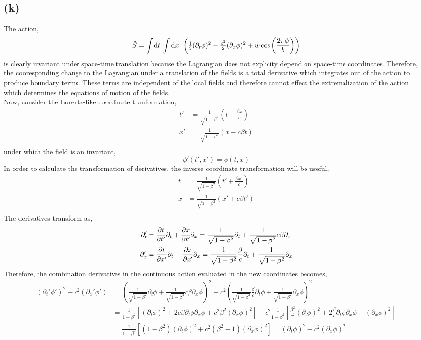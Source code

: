 \documentclass[12pt]{extarticle}
\begin{document}
\subsection*{(k)}
The action,
\[\tilde{S} = \int \mathrm{d}t \: \int \mathrm{d}x \: \: \left( \tfrac{1}{2} (\partial_t \phi)^2 - \tfrac{c^2}{2} (\partial_x \phi)^2 + w \cos \left(\frac{2 \pi \phi}{b} \right) \right) \]
is clearly invariant under space-time translation because the Lagrangian does not explicity depend on space-time coordinates. Therefore, the cooresponding change to the Lagrangian under a translation of the fields is a total derivative which integrates out of the action to produce boundary terms. These terms are independent of the local fields and therefore cannot effect the extremalization of the action which determines the equations of motion of the fields. \bigskip \\
Now, consider the Lorentz-like coordinate tranformation,
\begin{align*}
t' & = \frac{1}{\sqrt{1 - \beta^2}} \left( t - \frac{\beta x}{c} \right) \\
x' & = \frac{1}{\sqrt{1 - \beta^2}} \left( x - c \beta t \right) \\
\end{align*}
under which the field is an invariant,
\[\phi'(t', x')  = \phi(t, x)\]
In order to calculate the transformation of derivatives, the inverse coordinate transformation will be useful,
\begin{align*}
t & = \frac{1}{\sqrt{1 - \beta^2}} \left( t' + \frac{\beta x'}{c} \right) \\
x & = \frac{1}{\sqrt{1 - \beta^2}} \left( x' + c \beta t' \right) \\
\end{align*}
The derivatives transform as,
\begin{align*}
\partial_t' & = \frac{\partial{t}}{\partial{t'}} \partial_t + \frac{\partial{x}}{\partial{t'}} \partial_x = \frac{1}{\sqrt{1 - \beta^2}} \partial_t +  \frac{1}{\sqrt{1 - \beta^2}} c \beta \partial_x 
\\
\partial_x' & = \frac{\partial{t}}{\partial{x'}} \partial_t + \frac{\partial{x}}{\partial{x'}} \partial_x = \frac{1}{\sqrt{1 - \beta^2}} \frac{\beta}{c} \partial_t + \frac{1}{\sqrt{1 - \beta^2}} \partial_x 
\end{align*}
Therefore, the combination derivatives in the continuous action evaluated in the new coordinates becomes,
\begin{align*} 
(\partial_t' \phi')^2 - c^2 (\partial_x' \phi') & = \left( \frac{1}{\sqrt{1 - \beta^2}} \partial_t \phi +  \frac{1}{\sqrt{1 - \beta^2}} c \beta \partial_x \phi \right)^2 - c^2 \left( \frac{1}{\sqrt{1 - \beta^2}} \frac{\beta}{c} \partial_t \phi + \frac{1}{\sqrt{1 - \beta^2}} \partial_x \phi \right)^2 
\\
& = \frac{1}{1 - \beta^2} \left[ (\partial_t \phi)^2 + 2 c \beta \partial_t \phi \partial_x \phi + c^2 \beta^2 (\partial_x \phi)^2 \right] - c^2 \frac{1}{1 - \beta^2} \left[ \frac{\beta^2}{c^2} (\partial_t \phi)^2 + 2 \frac{\beta}{c} \partial_t \phi \partial_x \phi + (\partial_x \phi)^2 \right] 
\\
& = \frac{1}{1 - \beta^2} \left[ (1 - \beta^2) (\partial_t \phi)^2 + c^2 (\beta^2 - 1) (\partial_x \phi)^2 \right] = (\partial_t \phi)^2 - c^2 (\partial_x \phi)^2
\end{align*}
\end{document}
